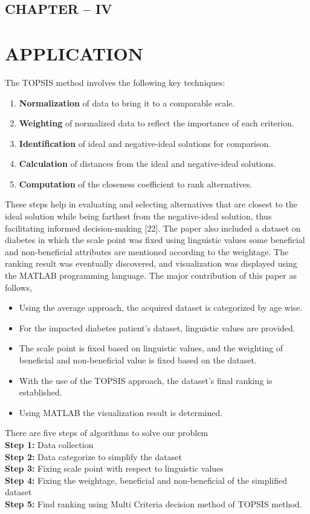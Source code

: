 \documentclass[12pt,a4paper]{article}
\begin{document}
\newpage
\begin{center}
    \section*{CHAPTER – IV}
\end{center}
\section{APPLICATION}
The TOPSIS method involves the following key techniques:
\begin{enumerate}
    \item \textbf{Normalization }of data to bring it to a comparable scale.
    \item \textbf{Weighting} of normalized data to reflect the importance of each criterion.
    \item \textbf{Identification} of ideal and negative-ideal solutions for comparison.
    \item \textbf{Calculation} of distances from the ideal and negative-ideal solutions.
    \item \textbf{Computation} of the closeness coefficient to rank alternatives.
\end{enumerate}

These steps help in evaluating and selecting alternatives that are closest to the ideal solution while being farthest from the negative-ideal solution, thus facilitating informed decision-making [22]. The paper also included a dataset on diabetes in which the scale point was fixed using linguistic values some beneficial and non-beneficial attributes are mentioned according to the weightage. The ranking result was eventually discovered, and visualization was displayed using the MATLAB programming language. The major contribution of this paper as follows, 
\begin{itemize}
    \item Using the average approach, the acquired dataset is categorized by age wise.
    \item For the impacted diabetes patient’s dataset, linguistic values are provided. 
    \item The scale point is fixed based on linguistic values, and the weighting of beneficial and non-beneficial value is fixed based on the dataset. 
    \item With the use of the TOPSIS approach, the dataset's final ranking is established. 
    \item Using MATLAB the visualization result is determined. 
\end{itemize}
There are five steps of algorithms to solve our problem\\
\textbf{Step 1:} Data collection\\
\textbf{Step 2:} Data categorize to simplify the dataset \\
\textbf{Step 3:} Fixing scale point with respect to linguistic values\\
\textbf{Step 4:} Fixing the weightage, beneficial and non-beneficial of the simplified dataset \\
\textbf{Step 5:} Find ranking using Multi Criteria decision method of TOPSIS method.
\end{document}
